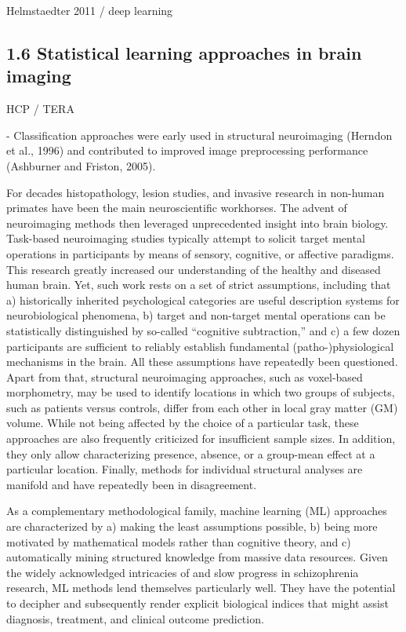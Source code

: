 \documentclass[authoryear,review,3p]{elsarticle}
\begin{document}
Helmstaedter 2011 / deep learning



\subsection*{1.6 Statistical learning approaches in brain imaging}

HCP / TERA

- Classification approaches were early used in structural neuroimaging (Herndon et al., 1996) and contributed to improved image preprocessing performance (Ashburner and Friston, 2005).


For decades histopathology, lesion studies, and invasive research in non-human primates have been the main neuroscientific workhorses. The advent of neuroimaging methods then leveraged unprecedented insight into brain biology. Task-based neuroimaging studies typically attempt to solicit target mental operations in participants by means of sensory, cognitive, or affective paradigms. This research greatly increased our understanding of the healthy and diseased human brain. Yet, such work rests on a set of strict assumptions, including that a) historically inherited psychological categories are useful description systems for neurobiological phenomena, b) target and non-target mental operations can be statistically distinguished by so-called “cognitive subtraction,” and c) a few dozen participants are sufficient to reliably establish fundamental (patho-)physiological mechanisms in the brain. All these assumptions have repeatedly been questioned. Apart from that, structural neuroimaging approaches, such as voxel-based morphometry, may be used to identify locations in which two groups of subjects, such as patients versus controls, differ from each other in local gray matter (GM) volume. While not being affected by the choice of a particular task, these approaches are also frequently criticized for insufficient sample sizes. In addition, they only allow characterizing presence, absence, or a group-mean effect at a particular location. Finally, methods for individual structural analyses are manifold and have repeatedly been in disagreement.

As a complementary methodological family, machine learning (ML) approaches are characterized by a) making the least assumptions possible, b) being more motivated by mathematical models rather than cognitive theory, and c) automatically mining structured knowledge from massive data resources. Given the widely acknowledged intricacies of and slow progress in schizophrenia research, ML methods lend themselves particularly well. They have the potential to decipher and subsequently render explicit biological indices that might assist diagnosis, treatment, and clinical outcome prediction.
\end{document}
